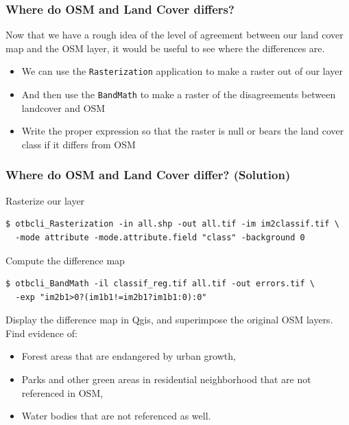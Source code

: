 \documentclass[8pt]{beamer}
\begin{document}
\begin{frame}
\frametitle{Where do OSM and Land Cover differs?}

Now that we have a rough idea of the level of agreement between our
land cover map and the OSM layer, it would be useful to see where the differences are.

\begin{itemize}
\item We can use the \texttt{Rasterization} application to make a raster out of our layer
\item And then use the \texttt{BandMath} to make a raster of the disagreements between landcover and OSM
\item Write the proper expression so that the raster is null or bears the land cover class if it differs from OSM
\end{itemize}

\end{frame}

\begin{frame}[fragile]
\frametitle{Where do OSM and Land Cover differ? (Solution)}

\begin{block}{Rasterize our layer}
\begin{scriptsize}
\begin{verbatim}
$ otbcli_Rasterization -in all.shp -out all.tif -im im2classif.tif \
  -mode attribute -mode.attribute.field "class" -background 0
\end{verbatim}
\end{scriptsize}
\end{block}
\begin{block}{Compute the difference map}
\begin{scriptsize}
\begin{verbatim}
$ otbcli_BandMath -il classif_reg.tif all.tif -out errors.tif \
  -exp "im2b1>0?(im1b1!=im2b1?im1b1:0):0"
\end{verbatim}
\end{scriptsize}
\end{block}
Display the difference map in Qgis, and superimpose the original OSM layers. Find evidence of:
\begin{itemize}
\item Forest areas that are endangered by urban growth,
\item Parks and other green areas in residential neighborhood that are not referenced in OSM,
\item Water bodies that are not referenced as well.
\end{itemize}
\end{frame}
\end{document}
